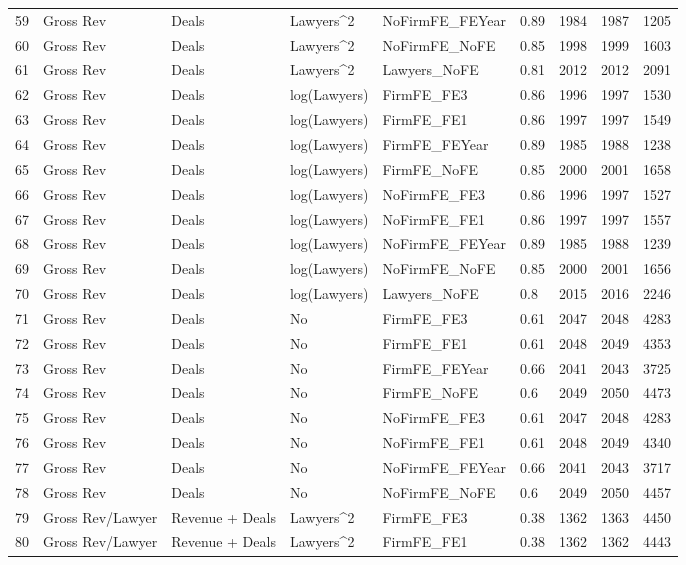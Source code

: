 \documentclass{article}
\begin{document}
\begin{table}[H]
\begin{tabular}{rllllllll}
  59 & Gross Rev & Deals & Lawyers^2 & NoFirmFE\_FEYear & 0.89 & 1984 & 1987 & 1205 \\ 
  60 & Gross Rev & Deals & Lawyers^2 & NoFirmFE\_NoFE & 0.85 & 1998 & 1999 & 1603 \\ 
  61 & Gross Rev & Deals & Lawyers^2 & Lawyers\_NoFE & 0.81 & 2012 & 2012 & 2091 \\ 
  62 & Gross Rev & Deals & log(Lawyers) & FirmFE\_FE3 & 0.86 & 1996 & 1997 & 1530 \\ 
  63 & Gross Rev & Deals & log(Lawyers) & FirmFE\_FE1 & 0.86 & 1997 & 1997 & 1549 \\ 
  64 & Gross Rev & Deals & log(Lawyers) & FirmFE\_FEYear & 0.89 & 1985 & 1988 & 1238 \\ 
  65 & Gross Rev & Deals & log(Lawyers) & FirmFE\_NoFE & 0.85 & 2000 & 2001 & 1658 \\ 
  66 & Gross Rev & Deals & log(Lawyers) & NoFirmFE\_FE3 & 0.86 & 1996 & 1997 & 1527 \\ 
  67 & Gross Rev & Deals & log(Lawyers) & NoFirmFE\_FE1 & 0.86 & 1997 & 1997 & 1557 \\ 
  68 & Gross Rev & Deals & log(Lawyers) & NoFirmFE\_FEYear & 0.89 & 1985 & 1988 & 1239 \\ 
  69 & Gross Rev & Deals & log(Lawyers) & NoFirmFE\_NoFE & 0.85 & 2000 & 2001 & 1656 \\ 
  70 & Gross Rev & Deals & log(Lawyers) & Lawyers\_NoFE & 0.8 & 2015 & 2016 & 2246 \\ 
  71 & Gross Rev & Deals & No & FirmFE\_FE3 & 0.61 & 2047 & 2048 & 4283 \\ 
  72 & Gross Rev & Deals & No & FirmFE\_FE1 & 0.61 & 2048 & 2049 & 4353 \\ 
  73 & Gross Rev & Deals & No & FirmFE\_FEYear & 0.66 & 2041 & 2043 & 3725 \\ 
  74 & Gross Rev & Deals & No & FirmFE\_NoFE & 0.6 & 2049 & 2050 & 4473 \\ 
  75 & Gross Rev & Deals & No & NoFirmFE\_FE3 & 0.61 & 2047 & 2048 & 4283 \\ 
  76 & Gross Rev & Deals & No & NoFirmFE\_FE1 & 0.61 & 2048 & 2049 & 4340 \\ 
  77 & Gross Rev & Deals & No & NoFirmFE\_FEYear & 0.66 & 2041 & 2043 & 3717 \\ 
  78 & Gross Rev & Deals & No & NoFirmFE\_NoFE & 0.6 & 2049 & 2050 & 4457 \\ 
  79 & Gross Rev/Lawyer & Revenue + Deals & Lawyers^2 & FirmFE\_FE3 & 0.38 & 1362 & 1363 & 4450 \\ 
  80 & Gross Rev/Lawyer & Revenue + Deals & Lawyers^2 & FirmFE\_FE1 & 0.38 & 1362 & 1362 & 4443 \\ 
   \hline
\end{tabular}
\end{table}
\end{document}

